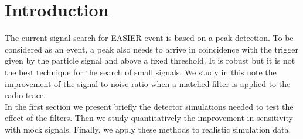 \section{Introduction}
The  current  signal  search for  EASIER  event  is  based on  a  peak
detection. To be  considered as an event, a peak  also needs to arrive
in coincidence with the trigger given by the particle signal and above
a fixed threshold.  It is robust  but it is not the best technique for
the search of small signals.  We study in this note the improvement of
the signal  to noise  ratio when  a matched filter  is applied  to the
radio trace.  %
\\ In  the first section  we present briefly the  detector simulations
needed  to   test  the   effect  of  the   filters.   Then   we  study
quantitatively    the   improvement    in   sensitivity    with   mock
signals. Finally, we apply these methods to realistic simulation data.
